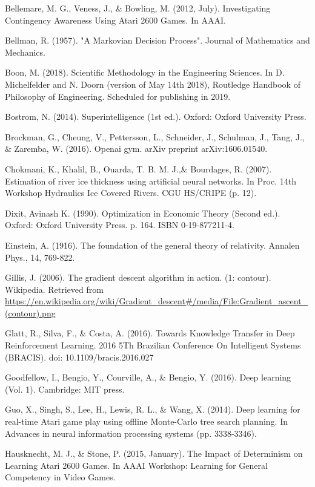 \begin{thebibliography}{99}
\bibitem{} Bellemare, M. G., Veness, J., \& Bowling, M. (2012, July). Investigating Contingency Awareness Using Atari 2600 Games. In AAAI.

\bibitem{} Bellman, R. (1957). "A Markovian Decision Process". Journal of Mathematics and Mechanics.

\bibitem{} Boon, M. (2018). Scientific Methodology in the Engineering Sciences. In D. Michelfelder and N. Doorn (version of May 14th 2018), Routledge Handbook of Philosophy of Engineering. Scheduled for publishing in 2019.

\bibitem{} Bostrom, N. (2014). Superintelligence (1st ed.). Oxford: Oxford University Press.

\bibitem{} Brockman, G., Cheung, V., Pettersson, L., Schneider, J., Schulman, J., Tang, J., \&
Zaremba, W. (2016). Openai gym. arXiv preprint arXiv:1606.01540.

\bibitem{} Chokmani, K., Khalil, B., Ouarda, T. B. M. J.,\& Bourdages, R. (2007). Estimation of river ice
thickness using artificial neural networks. In Proc. 14th Workshop Hydraulics Ice Covered Rivers. CGU HS/CRIPE (p. 12).

\bibitem{} Dixit, Avinash K. (1990). Optimization in Economic Theory (Second ed.). Oxford: Oxford University Press. p. 164. ISBN 0-19-877211-4.

\bibitem{} Einstein, A. (1916). The foundation of the general theory of relativity. Annalen Phys., 14, 769-822.

\bibitem{} Gillis, J. (2006). The gradient descent algorithm in action. (1: contour). Wikipedia. Retrieved
from \url{https://en.wikipedia.org/wiki/Gradient\_descent\#/media/File:Gradient\_ascent\_(contour).png}

\bibitem{} Glatt, R., Silva, F., \& Costa, A. (2016). Towards Knowledge Transfer in Deep Reinforcement Learning. 2016 5Th Brazilian Conference On Intelligent Systems (BRACIS). doi: 10.1109/bracis.2016.027

\bibitem{} Goodfellow, I., Bengio, Y., Courville, A., \& Bengio, Y. (2016). Deep learning (Vol. 1).
Cambridge: MIT press.

\bibitem{} Guo, X., Singh, S., Lee, H., Lewis, R. L., \& Wang, X. (2014). Deep learning for real-time Atari game play using offline Monte-Carlo tree search planning. In Advances in neural information processing systems (pp. 3338-3346).

\bibitem{} Hausknecht, M. J., \& Stone, P. (2015, January). The Impact of Determinism on Learning
Atari 2600 Games. In AAAI Workshop: Learning for General Competency in Video Games.


\end{thebibliography}
